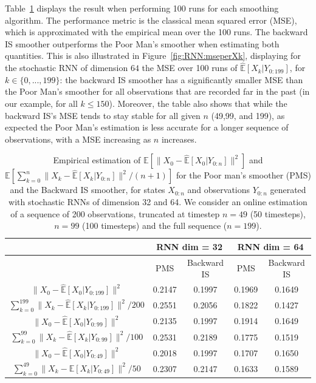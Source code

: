 \documentclass[12pt]{article}
\newcounter{example}[section]
\begin{document}
Table~\ref{table:RNN_exp} displays the result when performing 100 runs for each smoothing algorithm. 
The performance metric is the classical mean squared error (MSE), which is approximated with the empirical mean over the 100 runs.
The backward IS smoother outperforms the Poor Man's smoother when estimating both quantities. 
This is also illustrated in Figure~\ref{fig:RNN:mseperXk}, displaying for the stochastic RNN of dimension $64$ the MSE over 100 runs of $\mathbb{\widehat{E}}[X_k|Y_{0:199}]$, for $k \in \{0,...,199\}$: the backward IS smoother has a significantly  smaller MSE than the Poor Man's smoother for all observations that are recorded far in the past (in our example, for all $k \leqslant 150$).  
Moreover, the table also shows that while the backward IS's MSE tends to stay stable for all given $n$ (49,99, and 199), as expected the Poor Man's estimation is less accurate for a longer sequence of observations, with a MSE increasing as $n$ increases.

\begin{table}
\caption{Empirical estimation of $\mathbb{E}[\|X_0 - \mathbb{\widehat{E}}[X_0|Y_{0:n}]\|^2]$ and $\mathbb{E}[ \sum_{k=0}^{n}\|X_k - \mathbb{\widehat{E}}[X_k|Y_{0:n}]\|^2/(n+1)]$ for the Poor man's smoother (PMS) and the Backward IS smoother, for states $X_{0:n}$ and observations $Y_{0:n}$ generated with stochastic RNNs of dimension 32 and 64. We consider an online estimation of a sequence of 200 observations, truncated at timestep $n=49$ (50 timesteps), $n=99$ (100 timesteps) and the full sequence ($n=199$).}
\label{table:RNN_exp}
\centering 
\begin{tabular}{c|cc|cc}
 & \multicolumn{2}{c}{RNN dim = 32} & \multicolumn{2}{c}{RNN dim = 64} \\\toprule
\hline
 &  PMS & Backward IS &  PMS & Backward IS \\
\hline
$\|X_0 - \mathbb{\widehat{E}}[X_0|Y_{0:199}]\|^2$ & 0.2147 & 0.1997 & 0.1969 & 0.1649\\
$ \sum_{k=0}^{199} \|X_k - \mathbb{\widehat{E}}[X_k|Y_{0:199}]\|^2/200$ & 0.2551 & 0.2056  & 0.1822 & 0.1427 \\
\hline
$\|X_0 - \mathbb{\widehat{E}}[X_0|Y_{0:99}]\|^2$ & 0.2135 & 0.1997 & 0.1914 & 0.1649 \\
$ \sum_{k=0}^{99} \|X_k - \mathbb{\widehat{E}}[X_k|Y_{0:99}]\|^2/100$ & 0.2531 & 0.2189 & 0.1775 & 0.1519\\
\hline
$\|X_0 - \mathbb{\widehat{E}}[X_0|Y_{0:49}]\|^2$ & 0.2018 & 0.1997 & 0.1707 & 0.1650\\
$\sum_{k=0}^{49} \|X_k - \mathbb{\widehat{E}}[X_k|Y_{0:49}]\|^2/50$ & 0.2307 & 0.2147 & 0.1633 & 0.1589\\
\hline
\bottomrule
\end{tabular}
\end{table}
\end{document}

